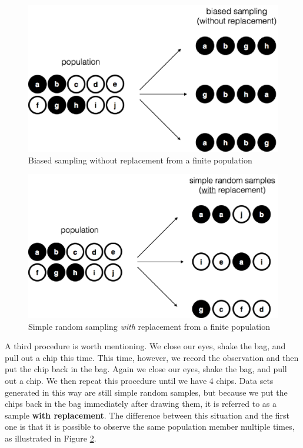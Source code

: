 \documentclass[
]{book}
\theoremstyle{definition}
\theoremstyle{definition}
\theoremstyle{definition}
\theoremstyle{definition}
\theoremstyle{remark}
\begin{document}
\begin{figure}

{\centering \includegraphics[width=0.66\linewidth]{resources/image/brs} 

}

\caption{Biased sampling without replacement from a finite population}\label{fig:brs}
\end{figure}



\begin{figure}

{\centering \includegraphics[width=0.66\linewidth]{resources/image/srs2} 

}

\caption{Simple random sampling \emph{with} replacement from a finite population}\label{fig:srs2}
\end{figure}

A third procedure is worth mentioning. We close our eyes, shake the bag, and pull out a chip this time. This time, however, we record the observation and then put the chip back in the bag. Again we close our eyes, shake the bag, and pull out a chip. We then repeat this procedure until we have 4 chips. Data sets generated in this way are still simple random samples, but because we put the chips back in the bag immediately after drawing them, it is referred to as a sample \textbf{with replacement}. The difference between this situation and the first one is that it is possible to observe the same population member multiple times, as illustrated in Figure \ref{fig:srs2}.
\end{document}
